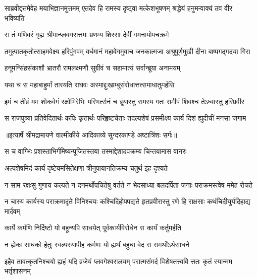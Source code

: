 \threelineshloka
{साब्रवीद्दत्तमेवेह मयाभिज्ञानमुत्तमम्}
{एतदेव हि रामस्य दृष्ट्वा मत्केशभूषणम्}
{श्रद्धेयं हनुमन्वाक्यं तव वीर भविष्यति} %

\twolineshloka
{स तं मणिवरं गृह्य श्रीमान्प्लवगसत्तमः}
{प्रणम्य शिरसा देवीं गमनायोपचक्रमे} %

\threelineshloka
{तमुत्पातकृतोत्साहमवेक्ष्य हरिपुंगवम्}
{वर्धमानं महावेगमुवाच जनकात्मजा}
{अश्रुपूर्णमुखी दीना बाष्पगद्गदया गिरा} %

\twolineshloka
{हनूमन्सिंहसंकाशौ भ्रातरौ रामलक्ष्मणौ}
{सुग्रीवं च सहामात्यं सर्वान्ब्रूया अनामयम्} %

\twolineshloka
{यथा च स महाबाहुर्मां तारयति राघवः}
{अस्माद्दुःखाम्बुसंरोधात्तत्समाधातुमर्हसि} %

\fourlineindentedshloka
{इमं च तीव्रं मम शोकवेगं}
{ रक्षोभिरेभिः परिभर्त्सनं च}
{ब्रूयास्तु रामस्य गतः समीपं}
{ शिवश्च तेऽध्वास्तु हरिप्रवीर} %

\fourlineindentedshloka
{स राजपुत्र्या प्रतिवेदितार्थः}
{ कपिः कृतार्थः परिहृष्टचेताः}
{तदल्पशेषं प्रसमीक्ष्य कार्यं}
{ दिशं ह्युदीचीं मनसा जगाम} %


{॥इत्यार्षे श्रीमद्रामायणे वाल्मीकीये आदिकाव्ये सुन्दरकाण्डे अष्टात्रिंशः सर्गः॥}


\twolineshloka
{स च वाग्भिः प्रशस्ताभिर्गमिष्यन्पूजितस्तया}
{तस्माद्देशादपक्रम्य चिन्तयामास वानरः} %

\twolineshloka
{अल्पशेषमिदं कार्यं दृष्टेयमसितेक्षणा}
{त्रीनुपायानतिक्रम्य चतुर्थ इह दृश्यते} %

\fourlineindentedshloka
{न साम रक्षःसु गुणाय कल्पते}
{ न दनमर्थोपचितेषु वर्तते}
{न भेदसाध्या बलदर्पिता जनाः}
{ पराक्रमस्त्वेष ममेह रोचते} %

\fourlineindentedshloka
{न चास्य कार्यस्य पराक्रमादृते}
{ विनिश्चयः कश्चिदिहोपपद्यते}
{हृतप्रवीरास्तु रणे हि राक्षसाः}
{ कथंचिदीयुर्यदिहाद्य मार्दवम्} %

\twolineshloka
{कार्ये कर्मणि निर्दिष्टो यो बहून्यपि साधयेत्}
{पूर्वकार्यविरोधेन स कार्यं कर्तुमर्हति} %

\twolineshloka
{न ह्येकः साधको हेतुः स्वल्पस्यापीह कर्मणः}
{यो ह्यर्थं बहुधा वेद स समर्थोऽर्थसाधने} %

\fourlineindentedshloka
{इहैव तावत्कृतनिश्चयो ह्यहं}
{ यदि व्रजेयं प्लवगेश्वरालयम्}
{परात्मसंमर्द विशेषतत्त्ववि}
{त्ततः कृतं स्यान्मम भर्तृशासनम्} %

